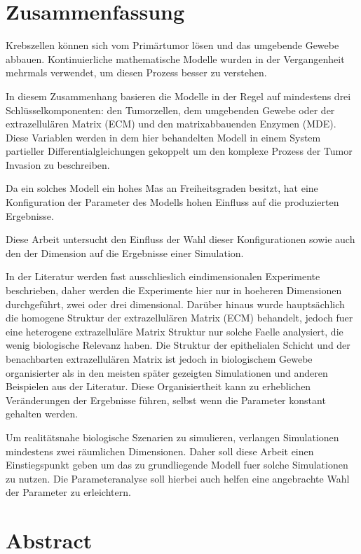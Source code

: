 \section*{Zusammenfassung}

Krebszellen können sich vom Primärtumor lösen und das umgebende Gewebe abbauen. 
Kontinuierliche mathematische Modelle wurden in der Vergangenheit mehrmals verwendet, um diesen Prozess besser zu verstehen.

In diesem Zusammenhang basieren die Modelle in der Regel auf mindestens drei Schlüsselkomponenten: den Tumorzellen, dem umgebenden Gewebe oder der extrazellulären Matrix (ECM) und den matrixabbauenden Enzymen (MDE). Diese Variablen werden in dem hier behandelten Modell in einem System partieller Differentialgleichungen gekoppelt um den komplexe Prozess der Tumor Invasion zu beschreiben.

Da ein solches Modell ein hohes Mas an Freiheitsgraden besitzt, hat eine Konfiguration der Parameter des Modells hohen Einfluss auf die produzierten Ergebnisse.

Diese Arbeit untersucht den Einfluss der Wahl dieser Konfigurationen sowie auch den der Dimension auf die Ergebnisse einer Simulation.

In der Literatur werden fast ausschlieslich eindimensionalen Experimente beschrieben, daher werden die Experimente hier nur in hoeheren Dimensionen durchgeführt, zwei oder drei dimensional. Darüber hinaus wurde hauptsächlich die homogene Struktur der extrazellulären Matrix (ECM) behandelt, jedoch fuer eine heterogene extrazelluläre Matrix Struktur nur solche Faelle analysiert, die wenig biologische Relevanz haben. Die Struktur der epithelialen Schicht und der benachbarten extrazellulären Matrix ist jedoch in biologischem Gewebe organisierter als in den meisten später gezeigten Simulationen und anderen Beispielen aus der Literatur. Diese Organisiertheit kann zu erheblichen Veränderungen der Ergebnisse führen, selbst wenn die Parameter konstant gehalten werden.

Um realitätsnahe biologische Szenarien zu simulieren, verlangen Simulationen mindestens zwei räumlichen Dimensionen. Daher soll diese Arbeit einen Einstiegspunkt geben um das zu grundliegende Modell fuer solche Simulationen zu nutzen. Die Parameteranalyse soll hierbei auch helfen eine angebrachte Wahl der Parameter zu erleichtern.

\clearpage
\section*{Abstract}

